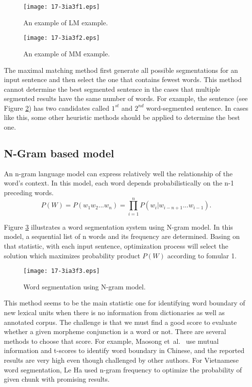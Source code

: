 \documentclass[english]{jnlp_1.4}
\begin{document}
\begin{figure}[b]
\begin{center}
\texttt{[image: 17-3ia3f1.eps]}
\caption{An example of LM example.}
\label{f11}
\end{center}
\end{figure}
\begin{figure}[b]
\begin{center}
\texttt{[image: 17-3ia3f2.eps]}
\caption{An example of MM example.} 
\label{f113}
\end{center}
\end{figure}


The maximal matching method first generate all possible segmentations for
an input sentence and then select the one that contains fewest
words. This method cannot determine the best segmented sentence in the
cases that multiple segmented results have the same number of words.
For example, the sentence (see Figure \ref{f113})
has two candidates called $1^{st}$ and $2^{nd}$ word-segmented sentence. In cases like this, some other heuristic methods should be
applied to determine the best one.


\subsection{N-Gram based model}

An n-gram language model can express relatively well the relationship of
the word's context. In this model, each word depends
probabilistically on the n-1 preceding words.
\begin{equation}\label{eq1}
P(W) = P(w_1w_2...w_n) = \prod_{i=1}^n P(w_i | w_{i-n+1}...w_{i-1}) .
\end{equation}

Figure \ref{firgure 1} illustrates a word segmentation system using N-gram model.
In this model, a sequential list of n words and its frequency are determined. Basing on that statistic,
with each input sentence, optimization process will select the
solution which maximizes probability product $P(W)$ according to fomular 1.

\begin{figure}[t]
\begin{center}
\texttt{[image: 17-3ia3f3.eps]}
\caption{Word segmentation using N-gram model.}
\label{firgure 1}
\end{center}
\end{figure}

This method seems to be the main statistic one for identifying word boundary of new lexical units when
there is no information from dictionaries as well as annotated corpus. The challenge is that
we must find a good score to evaluate whether a given morpheme conjunction is a word or not.
There are several methods to choose that score. For example, Maosong et~al.\ \cite{Mao98} use mutual information and t-scores to identify word boundary in Chinese,
and the reported results are very high even though challenged by other authors.
For Vietnamese word segmentation, Le Ha \cite{Ha03} used n-gram frequency to optimize the
probability of given chunk with promising results.
\end{document}
